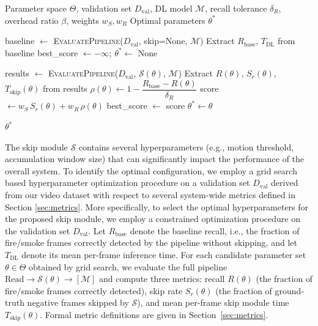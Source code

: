 \begin{algorithm}[htbp]
\caption{Skip Module Hyperparameter Selection}
\label{alg:hyperparam}
\begin{algorithmic}[1]

\Require Parameter space $\Theta$, validation set $D_{\text{val}}$,
DL model $\mathcal{M}$, recall tolerance $\delta_R$,
overhead ratio $\beta$, weights $w_S, w_R$
\Ensure Optimal parameters $\theta^*$

\State baseline $\gets$ \textsc{EvaluatePipeline}($D_{\text{val}}$, skip=None, $\mathcal{M}$)
\State Extract $R_{\text{base}}$, $T_{\text{DL}}$ from baseline
\State best\_score $\gets -\infty$; \quad $\theta^* \gets$ None

\State results $\gets$ \textsc{EvaluatePipeline}($D_{\text{val}}$, $\mathcal{S}(\theta)$, $\mathcal{M}$)
\State Extract $R(\theta)$, $S_r(\theta)$, $T_{\text{skip}}(\theta)$ from results
\State $\rho(\theta) \gets 1 - \dfrac{R_{\text{base}} - R(\theta)}{\delta_R}$
\State score $\gets w_S\, S_r(\theta) + w_R\, \rho(\theta)$
\State best\_score $\gets$ score
\State $\theta^* \gets \theta$
\EndIf
\EndIf
\EndFor

\State \Return $\theta^*$

\end{algorithmic}
\end{algorithm}

The skip module $\mathcal{S}$ contains several hyperparameters (e.g., motion
threshold, accumulation window size) that can significantly impact the
performance of the overall system. To identify the optimal configuration, we
employ a grid search based hyperparameter optimization procedure on a validation
set $D_{\text{val}}$ derived from our video dataset with respect to several
system-wide metrics defined in Section \ref{sec:metrics}. More specifically, to
select the optimal hyperparameters for the proposed skip module, we employ a
constrained optimization procedure on the validation set $D_{\text{val}}$. Let $R_{\text{base}}$ denote the baseline recall, i.e., the fraction of fire/smoke frames correctly detected by the pipeline without skipping, and let $T_{\text{DL}}$ denote its mean per-frame inference time. For
each candidate parameter set $\theta \in \Theta$ obtained by grid search, we
evaluate the full pipeline $\text{Read} \rightarrow \mathcal{S}(\theta)
\rightarrow [\mathcal{M}]$ and compute three metrics: recall $R(\theta)$ (the fraction of fire/smoke frames correctly detected), skip rate $S_r(\theta)$ (the fraction of ground-truth negative frames skipped by $\mathcal{S}$), and mean per-frame skip module time $T_{\text{skip}}(\theta)$. Formal metric definitions are given in Section~\ref{sec:metrics}.


